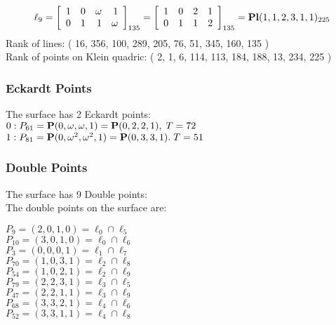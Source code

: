 \documentclass{article}
\newcommand{\bP}{{\bf P}}
\begin{document}
{$$
\ell_{9} = 
\left[
\begin{array}{*{4}{r}}
1 & 0 & \omega  & 1\\
0 & 1 & 1 & \omega \\
\end{array}
\right]
_{135}
=
\left[
\begin{array}{*{4}c}
1  & 0  & 2  & 1\\
0  & 1  & 1  & 2\\
\end{array}
\right]_{135}
={\rm\bf Pl}(1,1,2,3,1,1 )_{225}$$
Rank of lines: ( 16, 356, 100, 289, 205, 76, 51, 345, 160, 135 )\\
Rank of points on Klein quadric: ( 2, 1, 6, 114, 113, 184, 188, 13, 234, 225 )\\
\subsubsection*{Eckardt Points}
The surface has 2 Eckardt points:\\
$0 : P_{61}=\bP(0, \omega , \omega , 1) = \bP(0, 2, 2, 1),\; T= 72$\\
$1 : P_{81}=\bP(0, \omega^{2}, \omega^{2}, 1) = \bP(0, 3, 3, 1).\; T= 51$\\
\subsubsection*{Double Points}
The surface has 9 Double points:\\
The double points on the surface are:\\
\begin{multicols}{2}
\noindent
$P_{9} = ( 2, 0, 1, 0 ) = \ell_{0} \cap \ell_{5} $\\
$P_{10} = ( 3, 0, 1, 0 ) = \ell_{0} \cap \ell_{6} $\\
$P_{3} = ( 0, 0, 0, 1 ) = \ell_{1} \cap \ell_{7} $\\
$P_{70} = ( 1, 0, 3, 1 ) = \ell_{2} \cap \ell_{8} $\\
$P_{54} = ( 1, 0, 2, 1 ) = \ell_{2} \cap \ell_{9} $\\
$P_{79} = ( 2, 2, 3, 1 ) = \ell_{3} \cap \ell_{5} $\\
$P_{47} = ( 2, 2, 1, 1 ) = \ell_{3} \cap \ell_{9} $\\
$P_{68} = ( 3, 3, 2, 1 ) = \ell_{4} \cap \ell_{6} $\\
$P_{52} = ( 3, 3, 1, 1 ) = \ell_{4} \cap \ell_{8} $\\
\end{multicols}
}
\end{document}
